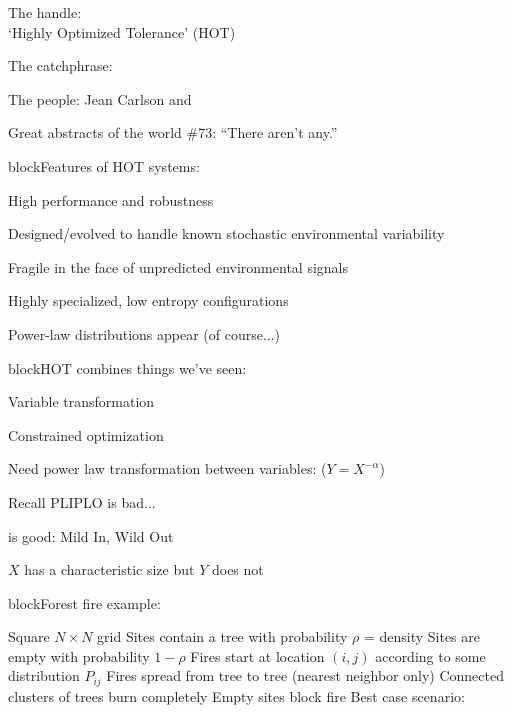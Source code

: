       The handle:\\
      `Highly Optimized Tolerance' (HOT)\cite{carlson1999a,carlson2000a,carlson2002a,sornette2003a}
      
      The catchphrase: 
      
      The people: Jean Carlson and 
      
      Great abstracts of the world \#73: ``There aren't any.''\cite{doyle1978a}
    
  

{block}{Features of HOT systems:\cite{carlson2000a,carlson2002a}}
    
     
      High performance and robustness
     
      Designed/evolved to handle known 
      stochastic environmental variability
     
      \alert{Fragile} in the face of unpredicted environmental signals
     
      Highly specialized, low entropy configurations
     
      Power-law distributions appear (of course...)
    
    
  
{block}{HOT combines things we've seen:}
    
     
      Variable transformation
     
      Constrained optimization
    
  

  
  
   
    Need power law transformation
    between variables: \alert{($Y = X^{-\alpha}$)}
   
    Recall PLIPLO is bad...
   
     is good{: Mild In, Wild Out}
   
    $X$ has a characteristic size but $Y$ does not
  
  

{block}{Forest fire example:\cite{carlson2000a}}
    
     Square $N\times{}N$ grid
     Sites contain a tree with probability $\rho$ = density
     Sites are empty with probability $1-\rho$
     Fires start at location $(i,j)$ according to some distribution $P_{ij}$
     Fires spread from tree to tree (nearest neighbor only)
     Connected clusters of trees burn completely
     Empty sites block fire
     \alert{Best case scenario:}\\
    
